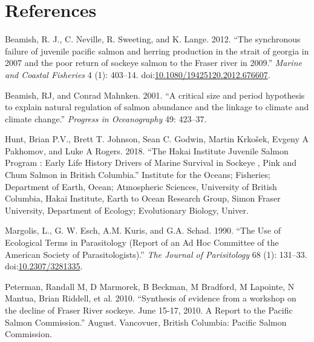 \documentclass[fleqn,10pt]{wlpeerj} %
\begin{document}
\section*{References}\label{references}

\hypertarget{refs}{}
\hypertarget{ref-Beamish2012}{}
Beamish, R. J., C. Neville, R. Sweeting, and K. Lange. 2012. ``The
synchronous failure of juvenile pacific salmon and herring production in
the strait of georgia in 2007 and the poor return of sockeye salmon to
the Fraser river in 2009.'' \emph{Marine and Coastal Fisheries} 4 (1):
403--14.
doi:\href{https://doi.org/10.1080/19425120.2012.676607}{10.1080/19425120.2012.676607}.

\hypertarget{ref-Beamish2001}{}
Beamish, RJ, and Conrad Mahnken. 2001. ``A critical size and period
hypothesis to explain natural regulation of salmon abundance and the
linkage to climate and climate change.'' \emph{Progress in Oceanography}
49: 423--37.

\hypertarget{ref-Hunt2018}{}
Hunt, Brian P.V., Brett T. Johnson, Sean C. Godwin, Martin Krkošek,
Evgeny A Pakhomov, and Luke A Rogers. 2018. ``The Hakai Institute
Juvenile Salmon Program : Early Life History Drivers of Marine Survival
in Sockeye , Pink and Chum Salmon in British Columbia.'' Institute for
the Oceans; Fisheries; Department of Earth, Ocean; Atmospheric Sciences,
University of British Columbia, Hakai Institute, Earth to Ocean Research
Group, Simon Fraser University, Department of Ecology; Evolutionary
Biology, Univer.

\hypertarget{ref-Margolis1990}{}
Margolis, L., G. W. Esch, A.M. Kuris, and G.A. Schad. 1990. ``The Use of
Ecological Terms in Parasitology (Report of an Ad Hoc Committee of the
American Society of Parasitologists).'' \emph{The Journal of
Parisitology} 68 (1): 131--33.
doi:\href{https://doi.org/10.2307/3281335}{10.2307/3281335}.

\hypertarget{ref-Peterman2010}{}
Peterman, Randall M, D Marmorek, B Beckman, M Bradford, M Lapointe, N
Mantua, Brian Riddell, et al. 2010. ``Synthesis of evidence from a
workshop on the decline of Fraser River sockeye. June 15-17, 2010. A
Report to the Pacific Salmon Commission.'' August. Vancovuer, British
Columbia: Pacific Salmon Commission.
\end{document}
